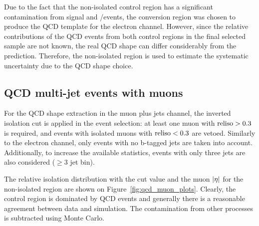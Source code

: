 Due to the fact that the non-isolated control region has a significant contamination from signal and \W/\ZpJets events,
the conversion region was chosen to produce the QCD template for the electron channel. However, since the relative
contributions of the QCD events from both control regions in the final selected sample are not known, the real QCD shape
can differ considerably from the prediction. Therefore, the non-isolated region is used to estimate the systematic
uncertainty due to the QCD shape choice.

\subsection{QCD multi-jet events with muons}
For the QCD shape extraction in the muon plus jets channel, the inverted isolation cut is applied in the event
selection: at least one muon with $\textrm{reliso}>0.3$ is required, and events with isolated muons with $\textrm{reliso}<0.3$ are
vetoed. Similarly to the electron channel, only events with no b-tagged jets are taken into account. Additionally, to
increase the available statistics, events with only three jets are also considered ($\geq 3$ jet bin).

The relative isolation distribution with the cut value and the muon $\lvert \eta \rvert$ for the non-isolated region are shown on
Figure~\ref{fig:qcd_muon_plots}. Clearly, the control region is dominated by QCD events and generally there is a
reasonable agreement between data and simulation. The contamination from other processes is subtracted using Monte
Carlo.

